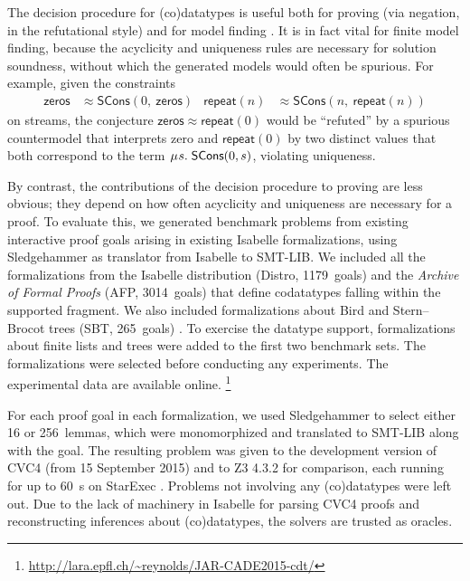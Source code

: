 \documentclass[smallcondensed,draft]{svjour3}
\newcommand\MU{\vvthinspace\mu\vvthinspace}
\newcommand\const[1]{\textsf{#1}}
\newcommand{\teq}{\approx}
\newcommand\vvthinspace{\kern+0.041667em}
\begin{document}
\newcommand\gandl{SBT}
\newcommand\HD[1]{\hbox to2em{\footnotesize\hfill\!\!\!\!#1\!\!\!\!\hfill}}

The decision procedure for (co)datatypes is useful both for proving (via
negation, in the refutational style) and for model finding
\cite{reynolds-et-al-2013,ge-de-moura-2009}.
It is in fact vital for finite model finding,
because the acyclicity and uniqueness rules are necessary for solution
soundness, without which the generated models would often be
spurious. For example, given the constraints
\begin{align*}
\const{zeros} & \teq \const{SCons}(0,\:\const{zeros})
& \const{repeat}(n) & \teq \const{SCons}(n,\:\const{repeat}(n))
\end{align*}
on streams, the conjecture
$\const{zeros} \teq \const{repeat}(0)$
would be ``refuted'' by a spurious countermodel that interprets
\const{zero} and $\const{repeat}(0)$ by two distinct
values that both correspond to the term
$\MU s.\; \const{SCons}(0, s)$,
violating uniqueness.

By contrast, the contributions of the decision procedure
to proving are less obvious; they depend on how
often acyclicity and uniqueness are necessary for a proof.
To evaluate this,
we generated benchmark problems from existing interactive
proof goals arising in existing
Isabelle formalizations, using Sledgehammer \cite{blanchette-et-al-2013-smt}
as translator from Isabelle to SMT-LIB.
We
included all the formalizations from the Isabelle distribution (Distro, 1179~goals)
and the \emph{Archive of Formal Proofs} (AFP, 3014~goals) \cite{klein-et-al-afp}
that define codatatypes falling within the supported fragment. We
also included formalizations about Bird and Stern--Brocot trees (\gandl,
265~goals) \cite{gammie-lochbihler-2016}. To exercise the datatype support, formalizations about finite
lists and trees
were added to the first two benchmark sets. The formalizations were selected before
conducting any experiments. The experimental data are available
online.%
\footnote{\url{http://lara.epfl.ch/~reynolds/JAR-CADE2015-cdt/}}



For each proof goal in each formalization, we used Sledgehammer to select either 16 or
256~lemmas, which were monomorphized and translated to SMT-LIB along with the
goal. The resulting problem was given to the
development version of CVC4
(from 15 September 2015) and to
Z3 4.3.2 for comparison, each running for
up to 60~s on StarExec \cite{stump-et-al-2014-starexec}.
Problems not involving any (co)datatypes were left out.
Due to the lack of machinery in Isabelle for parsing CVC4 proofs and
reconstructing inferences about (co)datatypes, the solvers are trusted
as oracles. %
\end{document}

